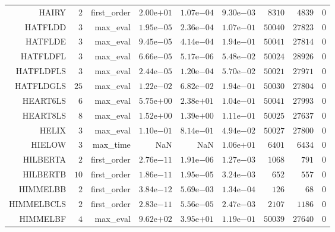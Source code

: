 \begin{longtable}{rrrrrrrrr}
HAIRY & \(     2\) & first\_order & \( 2.00\)e\(+01\) & \( 1.07\)e\(-04\) & \( 9.30\)e\(-03\) & \(  8310\) & \(  4839\) & \(     0\) \\
HATFLDD & \(     3\) & max\_eval & \( 1.95\)e\(-05\) & \( 2.36\)e\(-04\) & \( 1.07\)e\(-01\) & \( 50040\) & \( 27823\) & \(     0\) \\
HATFLDE & \(     3\) & max\_eval & \( 9.45\)e\(-05\) & \( 4.14\)e\(-04\) & \( 1.94\)e\(-01\) & \( 50041\) & \( 27814\) & \(     0\) \\
HATFLDFL & \(     3\) & max\_eval & \( 6.66\)e\(-05\) & \( 5.17\)e\(-06\) & \( 5.48\)e\(-02\) & \( 50024\) & \( 28926\) & \(     0\) \\
HATFLDFLS & \(     3\) & max\_eval & \( 2.44\)e\(-05\) & \( 1.20\)e\(-04\) & \( 5.70\)e\(-02\) & \( 50021\) & \( 27971\) & \(     0\) \\
HATFLDGLS & \(    25\) & max\_eval & \( 1.22\)e\(-02\) & \( 6.82\)e\(-02\) & \( 1.94\)e\(-01\) & \( 50030\) & \( 27804\) & \(     0\) \\
HEART6LS & \(     6\) & max\_eval & \( 5.75\)e\(+00\) & \( 2.38\)e\(+01\) & \( 1.04\)e\(-01\) & \( 50041\) & \( 27993\) & \(     0\) \\
HEART8LS & \(     8\) & max\_eval & \( 1.52\)e\(+00\) & \( 1.39\)e\(+00\) & \( 1.11\)e\(-01\) & \( 50025\) & \( 27637\) & \(     0\) \\
HELIX & \(     3\) & max\_eval & \( 1.10\)e\(-01\) & \( 8.14\)e\(-01\) & \( 4.94\)e\(-02\) & \( 50027\) & \( 27800\) & \(     0\) \\
HIELOW & \(     3\) & max\_time &       NaN &       NaN & \( 1.06\)e\(+01\) & \(  6401\) & \(  6434\) & \(     0\) \\
HILBERTA & \(     2\) & first\_order & \( 2.76\)e\(-11\) & \( 1.91\)e\(-06\) & \( 1.27\)e\(-03\) & \(  1068\) & \(   791\) & \(     0\) \\
HILBERTB & \(    10\) & first\_order & \( 1.86\)e\(-11\) & \( 1.95\)e\(-05\) & \( 3.24\)e\(-03\) & \(   652\) & \(   557\) & \(     0\) \\
HIMMELBB & \(     2\) & first\_order & \( 3.84\)e\(-12\) & \( 5.69\)e\(-03\) & \( 1.34\)e\(-04\) & \(   126\) & \(    68\) & \(     0\) \\
HIMMELBCLS & \(     2\) & first\_order & \( 2.83\)e\(-11\) & \( 5.56\)e\(-05\) & \( 2.47\)e\(-03\) & \(  2107\) & \(  1186\) & \(     0\) \\
HIMMELBF & \(     4\) & max\_eval & \( 9.62\)e\(+02\) & \( 3.95\)e\(+01\) & \( 1.19\)e\(-01\) & \( 50039\) & \( 27640\) & \(     0\) \\

\end{longtable}
